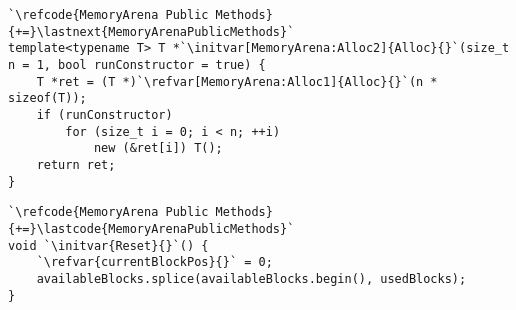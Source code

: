 \begin{lstlisting}
`\refcode{MemoryArena Public Methods}{+=}\lastnext{MemoryArenaPublicMethods}`
template<typename T> T *`\initvar[MemoryArena:Alloc2]{Alloc}{}`(size_t n = 1, bool runConstructor = true) {
    T *ret = (T *)`\refvar[MemoryArena:Alloc1]{Alloc}{}`(n * sizeof(T));
    if (runConstructor)
        for (size_t i = 0; i < n; ++i)
            new (&ret[i]) T();
    return ret;
}
\end{lstlisting}

\begin{lstlisting}
`\refcode{MemoryArena Public Methods}{+=}\lastcode{MemoryArenaPublicMethods}`
void `\initvar{Reset}{}`() {
    `\refvar{currentBlockPos}{}` = 0;
    availableBlocks.splice(availableBlocks.begin(), usedBlocks);
}
\end{lstlisting}